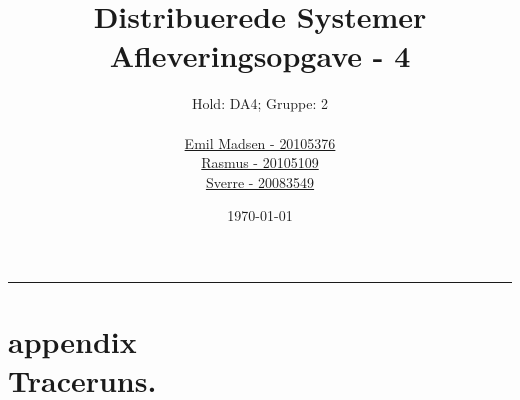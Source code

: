 \title{\huge Distribuerede Systemer \\
       \small Afleveringsopgave - 4 }
\author{Hold: DA4; Gruppe: 2\\ \\
        \href{mailto:skeen@cs.au.dk}{Emil Madsen - 20105376}\\
        \href{mailto:emray@cs.au.dk}{Rasmus - 20105109}\\
        \href{mailto:sverre@cs.au.dk}{Sverre - 20083549}
       }
\date{\today}

\maketitle

\hrule






\newpage
\section*{appendix \\
\normalsize Traceruns.}


